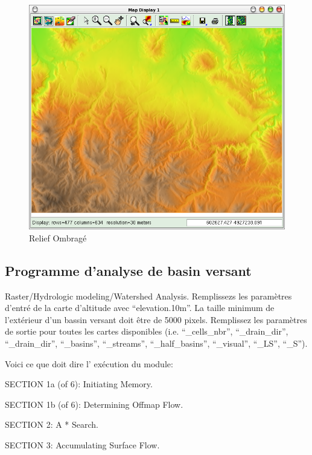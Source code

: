 \begin{figure}[htbp]
   \centering
   \includegraphics[scale=0.35]{grass011.png}
   \caption{Relief Ombrag\'e}
   \label{fig:grass011}
\end{figure}

\subsection{Programme d'analyse de basin versant}
Raster/Hydrologic modeling/Watershed Analysis.
Remplissezs les param\`etres d'entr\'e de la carte d'altitude avec ``elevation.10m''. La taille minimum de l'ext\'erieur d'un bassin versant doit \^etre de 5000 pixels. Remplissez les param\`etres de sortie pour toutes les cartes disponibles (i.e. ``\_cells\_nbr'', ``\_drain\_dir'', ``\_drain\_dir'', ``\_basins'', ``\_streams'', ``\_half\_basins'', ``\_visual'', ``\_LS'', ``\_S'').

Voici ce que doit dire l' ex\'ecution du module:

SECTION 1a (of 6): Initiating Memory.

SECTION 1b (of 6): Determining Offmap Flow.

SECTION 2: A * Search. 

SECTION 3: Accumulating Surface Flow.

